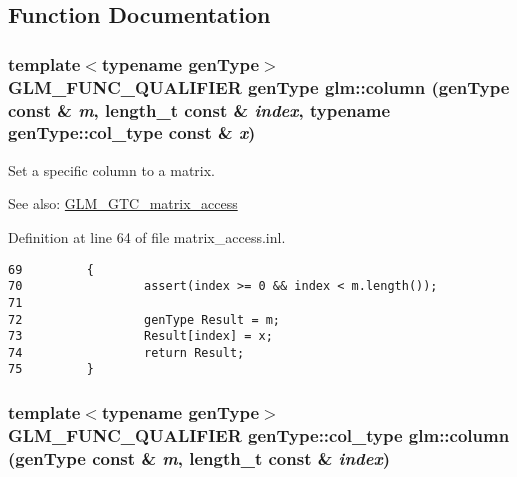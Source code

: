 \subsection{Function Documentation}
\hypertarget{group__gtc__matrix__access_gea14296c0a9299135e7c7c03826c2604}{
\subsubsection[column]{\setlength{\rightskip}{0pt plus 5cm}template$<$typename genType$>$ GLM\_\-FUNC\_\-QUALIFIER genType glm::column (genType const \& {\em m}, \/  length\_\-t const \& {\em index}, \/  typename genType::col\_\-type const \& {\em x})}}
\label{group__gtc__matrix__access_gea14296c0a9299135e7c7c03826c2604}


Set a specific column to a matrix. \begin{Desc}
\item[See also:]\hyperlink{group__gtc__matrix__access}{GLM\_\-GTC\_\-matrix\_\-access} \end{Desc}


Definition at line 64 of file matrix\_\-access.inl.

\begin{Code}\begin{verbatim}69         {
70                 assert(index >= 0 && index < m.length());
71 
72                 genType Result = m;
73                 Result[index] = x;
74                 return Result;
75         }
\end{verbatim}
\end{Code}


\hypertarget{group__gtc__matrix__access_g8cd6c920268e4e2eb90ed2b30665d9e5}{
\subsubsection[column]{\setlength{\rightskip}{0pt plus 5cm}template$<$typename genType$>$ GLM\_\-FUNC\_\-QUALIFIER genType::col\_\-type glm::column (genType const \& {\em m}, \/  length\_\-t const \& {\em index})}}
\label{group__gtc__matrix__access_g8cd6c920268e4e2eb90ed2b30665d9e5}


